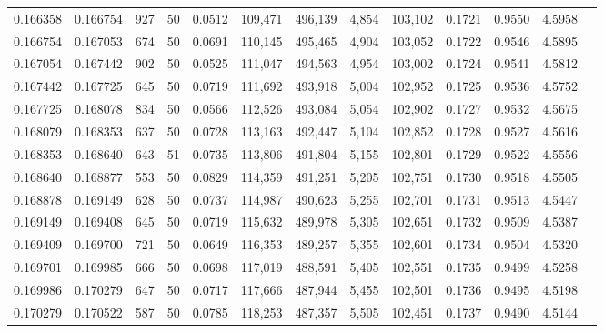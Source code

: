\begin{tabular}{rrrrrrrrrrrrr}
0.166358 & 0.166754 &   927 &  50 &                                     0.0512 & 109,471 & 496,139 &   4,854 & 103,102 & 0.1721 & 0.9550 & 4.5958 \\
0.166754 & 0.167053 &   674 &  50 &                                     0.0691 & 110,145 & 495,465 &   4,904 & 103,052 & 0.1722 & 0.9546 & 4.5895 \\
0.167054 & 0.167442 &   902 &  50 &                                     0.0525 & 111,047 & 494,563 &   4,954 & 103,002 & 0.1724 & 0.9541 & 4.5812 \\
0.167442 & 0.167725 &   645 &  50 &                                     0.0719 & 111,692 & 493,918 &   5,004 & 102,952 & 0.1725 & 0.9536 & 4.5752 \\
0.167725 & 0.168078 &   834 &  50 &                                     0.0566 & 112,526 & 493,084 &   5,054 & 102,902 & 0.1727 & 0.9532 & 4.5675 \\
0.168079 & 0.168353 &   637 &  50 &                                     0.0728 & 113,163 & 492,447 &   5,104 & 102,852 & 0.1728 & 0.9527 & 4.5616 \\
0.168353 & 0.168640 &   643 &  51 &                                     0.0735 & 113,806 & 491,804 &   5,155 & 102,801 & 0.1729 & 0.9522 & 4.5556 \\
0.168640 & 0.168877 &   553 &  50 &                                     0.0829 & 114,359 & 491,251 &   5,205 & 102,751 & 0.1730 & 0.9518 & 4.5505 \\
0.168878 & 0.169149 &   628 &  50 &                                     0.0737 & 114,987 & 490,623 &   5,255 & 102,701 & 0.1731 & 0.9513 & 4.5447 \\
0.169149 & 0.169408 &   645 &  50 &                                     0.0719 & 115,632 & 489,978 &   5,305 & 102,651 & 0.1732 & 0.9509 & 4.5387 \\
0.169409 & 0.169700 &   721 &  50 &                                     0.0649 & 116,353 & 489,257 &   5,355 & 102,601 & 0.1734 & 0.9504 & 4.5320 \\
0.169701 & 0.169985 &   666 &  50 &                                     0.0698 & 117,019 & 488,591 &   5,405 & 102,551 & 0.1735 & 0.9499 & 4.5258 \\
0.169986 & 0.170279 &   647 &  50 &                                     0.0717 & 117,666 & 487,944 &   5,455 & 102,501 & 0.1736 & 0.9495 & 4.5198 \\
0.170279 & 0.170522 &   587 &  50 &                                     0.0785 & 118,253 & 487,357 &   5,505 & 102,451 & 0.1737 & 0.9490 & 4.5144 \\

\end{tabular}
